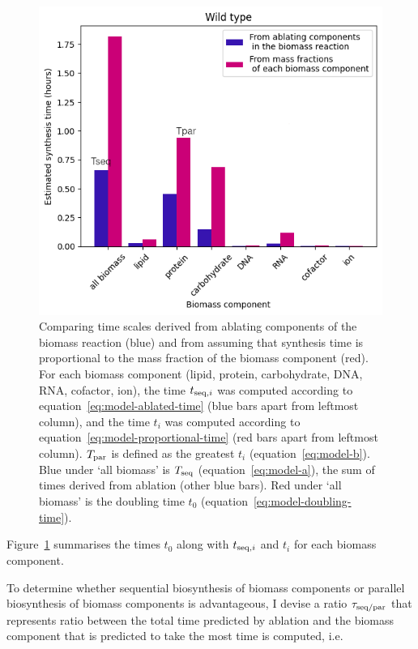 \begin{figure}
  \centering
  \includegraphics[width=.9\linewidth]{ablation_example_ratio.png}
  \caption{
    Comparing time scales derived from ablating components of the biomass reaction (blue) and from assuming that synthesis time is proportional to the mass fraction of the biomass component (red).
    For each biomass component (lipid, protein, carbohydrate, DNA, RNA, cofactor, ion), the time $t_{\mathrm{seq},i}$ was computed according to equation~\ref{eq:model-ablated-time} (blue bars apart from leftmost column), and the time $t_{i}$ was computed according to equation~\ref{eq:model-proportional-time} (red bars apart from leftmost column).
    $T_{\mathrm{par}}$ is defined as the greatest $t_{i}$ (equation~\ref{eq:model-b}).
    Blue under `all biomass' is $T_{\mathrm{seq}}$ (equation~\ref{eq:model-a}), the sum of times derived from ablation (other blue bars).
    Red under `all biomass' is the doubling time $t_{0}$ (equation~\ref{eq:model-doubling-time}).
  }
  \label{fig:model-ablate-times}
\end{figure}

Figure~\ref{fig:model-ablate-times} summarises the times $t_{0}$ along with $t_{\mathrm{seq},i}$ and $t_{i}$ for each biomass component.

To determine whether sequential biosynthesis of biomass components or parallel biosynthesis of biomass components is advantageous, I devise a ratio $\tau_{\mathrm{seq}/\mathrm{par}}$ that represents ratio between the total time predicted by ablation and the biomass component that is predicted to take the most time is computed, i.e.\


